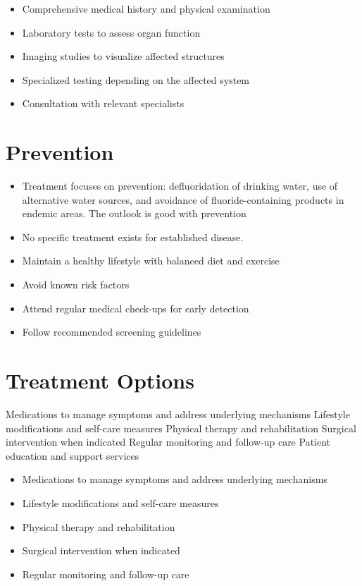 \begin{itemize}[noitemsep]
  \item Comprehensive medical history and physical examination
  \item Laboratory tests to assess organ function
  \item Imaging studies to visualize affected structures
  \item Specialized testing depending on the affected system
  \item Consultation with relevant specialists
\end{itemize}
\section{Prevention}
\begin{itemize}[noitemsep]
  \item Treatment focuses on prevention: defluoridation of drinking water, use of alternative water sources, and avoidance of fluoride-containing products in endemic areas. The outlook is good with prevention
  \item No specific treatment exists for established disease.
  \item Maintain a healthy lifestyle with balanced diet and exercise
  \item Avoid known risk factors
  \item Attend regular medical check-ups for early detection
  \item Follow recommended screening guidelines
\end{itemize}
\section{Treatment Options}
Medications to manage symptoms and address underlying mechanisms Lifestyle modifications and self-care measures Physical therapy and rehabilitation Surgical intervention when indicated Regular monitoring and follow-up care Patient education and support services

\begin{itemize}[noitemsep]
  \item Medications to manage symptoms and address underlying mechanisms
  \item Lifestyle modifications and self-care measures
  \item Physical therapy and rehabilitation
  \item Surgical intervention when indicated
  \item Regular monitoring and follow-up care
\end{itemize}
